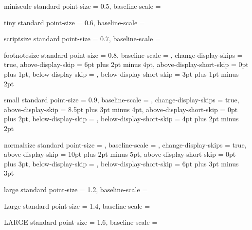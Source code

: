  {miniscule} {standard}
  {
    point-size     = \ScaleToNearestTenthPoint {\NormalPointSize} {0.5},
    baseline-scale = \NormalBaselineScale
  }

 {tiny} {standard}
  {
    point-size     = \ScaleToNearestTenthPoint {\NormalPointSize} {0.6},
    baseline-scale = \NormalBaselineScale
  }

 {scriptsize} {standard}
  {
    point-size     = \ScaleToNearestTenthPoint {\NormalPointSize} {0.7},
    baseline-scale = \NormalBaselineScale
  }

 {footnotesize} {standard}
  {
    point-size               = \ScaleToNearestTenthPoint {\NormalPointSize} {0.8},
    baseline-scale           = \NormalBaselineScale,
    change-display-skips     = true,
    above-display-skip       = 6pt plus 2pt minus 4pt,
    above-display-short-skip = 0pt plus 1pt,
    below-display-skip       = ,
    below-display-short-skip = 3pt plus 1pt minus 2pt
  }

 {small} {standard}
  {
    point-size               = \ScaleToNearestTenthPoint {\NormalPointSize} {0.9},
    baseline-scale           = \NormalBaselineScale,
    change-display-skips     = true,
    above-display-skip       = 8.5pt plus 3pt minus 4pt,
    above-display-short-skip = 0pt plus 2pt,
    below-display-skip       = ,
    below-display-short-skip = 4pt plus 2pt minus 2pt
  }

 {normalsize} {standard}
  {
    point-size               = \NormalPointSize,
    baseline-scale           = \NormalBaselineScale,
    change-display-skips     = true,
    above-display-skip       = 10pt plus 2pt minus 5pt,
    above-display-short-skip = 0pt plus 3pt,
    below-display-skip       = ,
    below-display-short-skip = 6pt plus 3pt minus 3pt
  }

 {large} {standard}
  {
    point-size     = \ScaleToNearestTenthPoint {\NormalPointSize} {1.2},
    baseline-scale = \NormalBaselineScale
  }

 {Large} {standard}
  {
    point-size     = \ScaleToNearestTenthPoint {\NormalPointSize} {1.4},
    baseline-scale = \NormalBaselineScale
  }

 {LARGE} {standard}
  {
    point-size     = \ScaleToNearestTenthPoint {\NormalPointSize} {1.6},
    baseline-scale = \NormalBaselineScale
  }


